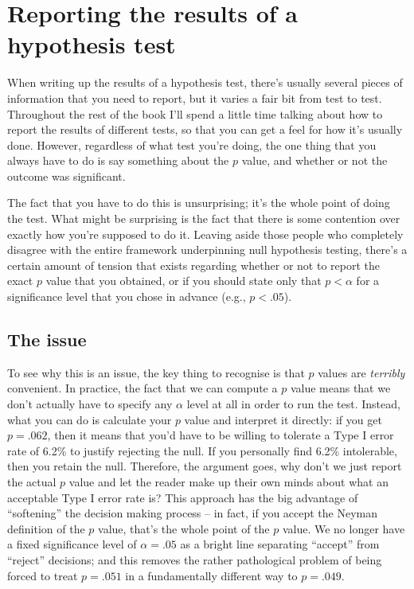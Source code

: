 \documentclass[
]{book}
\begin{document}
\hypertarget{writeup}{%
\section{Reporting the results of a hypothesis test}\label{writeup}}

When writing up the results of a hypothesis test, there's usually several pieces of information that you need to report, but it varies a fair bit from test to test. Throughout the rest of the book I'll spend a little time talking about how to report the results of different tests, so that you can get a feel for how it's usually done. However, regardless of what test you're doing, the one thing that you always have to do is say something about the \(p\) value, and whether or not the outcome was significant.

The fact that you have to do this is unsurprising; it's the whole point of doing the test. What might be surprising is the fact that there is some contention over exactly how you're supposed to do it. Leaving aside those people who completely disagree with the entire framework underpinning null hypothesis testing, there's a certain amount of tension that exists regarding whether or not to report the exact \(p\) value that you obtained, or if you should state only that \(p < \alpha\) for a significance level that you chose in advance (e.g., \(p<.05\)).

\hypertarget{the-issue}{%
\subsection{The issue}\label{the-issue}}

To see why this is an issue, the key thing to recognise is that \(p\) values are \emph{terribly} convenient. In practice, the fact that we can compute a \(p\) value means that we don't actually have to specify any \(\alpha\) level at all in order to run the test. Instead, what you can do is calculate your \(p\) value and interpret it directly: if you get \(p = .062\), then it means that you'd have to be willing to tolerate a Type I error rate of 6.2\% to justify rejecting the null. If you personally find 6.2\% intolerable, then you retain the null. Therefore, the argument goes, why don't we just report the actual \(p\) value and let the reader make up their own minds about what an acceptable Type I error rate is? This approach has the big advantage of ``softening'' the decision making process -- in fact, if you accept the Neyman definition of the \(p\) value, that's the whole point of the \(p\) value. We no longer have a fixed significance level of \(\alpha = .05\) as a bright line separating ``accept'' from ``reject'' decisions; and this removes the rather pathological problem of being forced to treat \(p = .051\) in a fundamentally different way to \(p = .049\).
\end{document}
